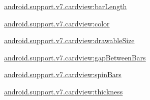{\ttfamily \hyperlink{classandroid_1_1support_1_1v7_1_1cardview_1_1R_1_1styleable_a40a9aac17c990350376902953712f1f3}{android.\+support.\+v7.\+cardview\+:bar\+Length}}

{\ttfamily \hyperlink{classandroid_1_1support_1_1v7_1_1cardview_1_1R_1_1styleable_ae91140445253d7469509b370ae70f855}{android.\+support.\+v7.\+cardview\+:color}}

{\ttfamily \hyperlink{classandroid_1_1support_1_1v7_1_1cardview_1_1R_1_1styleable_a6d4ecae9e68c499196ff3d66052769ef}{android.\+support.\+v7.\+cardview\+:drawable\+Size}}

{\ttfamily \hyperlink{classandroid_1_1support_1_1v7_1_1cardview_1_1R_1_1styleable_afc4238a0fa5fbdfef7ef7f8e7e7a5fd7}{android.\+support.\+v7.\+cardview\+:gap\+Between\+Bars}}

{\ttfamily \hyperlink{classandroid_1_1support_1_1v7_1_1cardview_1_1R_1_1styleable_adbe4eb7965e87739bfab8deb04a80751}{android.\+support.\+v7.\+cardview\+:spin\+Bars}}

{\ttfamily \hyperlink{classandroid_1_1support_1_1v7_1_1cardview_1_1R_1_1styleable_a9f8600b105c84f3a4e3054884f09d49e}{android.\+support.\+v7.\+cardview\+:thickness}}

